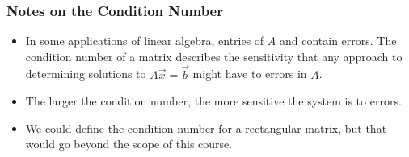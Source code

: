 \begin{frame} \frametitle{Notes on the Condition Number}


        \begin{itemize}
        \item<2-> In some applications of linear algebra, entries of $A$ and contain errors. The condition number of a matrix describes the sensitivity that any approach to determining solutions to $A\vec x = \vec b$ might have to errors in $A$.
        \item<3-> The larger the condition number, the more sensitive the system is to errors. 
        \item<4-> We could define the condition number for a rectangular matrix, but that would go beyond the scope of this course.
    \end{itemize}

\end{frame}







